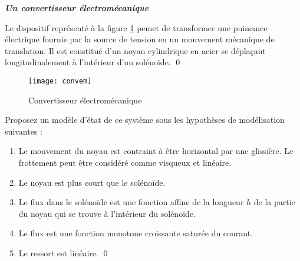 \begin{exercice}{\bf \em Un convertisseur électromécanique}

Le dispositif représenté à la figure \ref{fig:convem} pemet de transformer une
puissance
électrique fournie par la source de tension en un mouvement mécanique de translation.  Il
est constitué d'un noyau cylindrique en acier se déplaçant longitudinalement à
l'intérieur d'un solénoïde. \qed
\begin{figure}[htbp]
\begin{center}
\texttt{[image: convem]}
\caption{Convertisseur électromécanique}
\label{fig:convem}
\end{center}
\end{figure}

Proposez un modèle d'état de ce système sous les hypothèses de modélisation
suivantes :
\begin{enumerate}
\item Le mouvement du noyau est contraint à être horizontal par une glissière.  Le
frottement peut être considéré comme visqueux et linéaire.
\item Le noyau est plus court que le solénoïde.
\item Le flux dans le solénoïde est une fonction affine de la longueur $h$ de la partie du
noyau qui se trouve à l'intérieur du solénoïde.
\item Le flux est une fonction monotone croissante saturée du courant.
\item Le ressort est linéaire. \qed
\end{enumerate}
\end{exercice}


